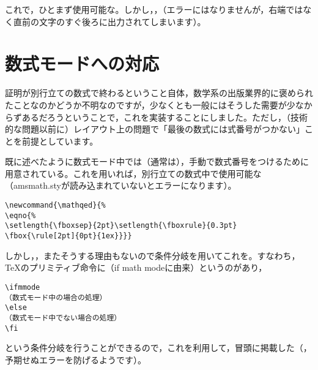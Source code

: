 \documentclass[autodetect-engine,dvipdfmx]{jsarticle}
\begin{document}
これで，ひとまず使用可能な\verb@{}。しかし，\verb@{}，\verb@{}（エラーにはなりませんが，右端ではなく直前の文字のすぐ後ろに出力されてしまいます）。

\part{数式モードへの対応}

証明が別行立ての数式で終わるということ自体，数学系の出版業界的に褒められたことなのかどうか不明なのですが，少なくとも一般にはそうした需要が少なからずあるだろうということで，これを実装することにしました。ただし，（技術的な問題以前に）レイアウト上の問題で「最後の数式には式番号がつかない」ことを前提としています。

既に述べたように数式モード中では（通常は）\verb@{}，手動で数式番号をつけるために用意されている\verb@{}。これを用いれば，別行立ての数式中で使用可能な\verb@{}（amsmath.styが読み込まれていないとエラーになります）。

\begin{tcolorbox}

\begin{verbatim}
\newcommand{\mathqed}{%
\eqno{%
\setlength{\fboxsep}{2pt}\setlength{\fboxrule}{0.3pt}
\fbox{\rule[2pt]{0pt}{1ex}}}}
\end{verbatim}

\end{tcolorbox}

しかし，\verb@{}\verb@{}，またそうする理由もないので条件分岐を用いてこれを\verb@{}。すなわち，\TeX のプリミティブ命令に\verb@\ifmmode@（if math modeに由来）というのがあり，

\begin{tcolorbox}

\begin{verbatim}
\ifmmode
（数式モード中の場合の処理）
\else
（数式モード中でない場合の処理）
\fi
\end{verbatim}

\end{tcolorbox}

という条件分岐を行うことができるので，これを利用して，冒頭に掲載した\verb@{}（\verb@{}\verb@{}，予期せぬエラーを防げるようです）。
\end{document}
